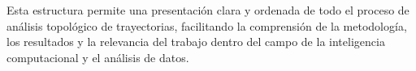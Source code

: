 
Esta estructura permite una presentación clara y ordenada de todo el proceso de análisis topológico de trayectorias, facilitando la comprensión de la metodología, los resultados y la relevancia del trabajo dentro del campo de la inteligencia computacional y el análisis de datos.


